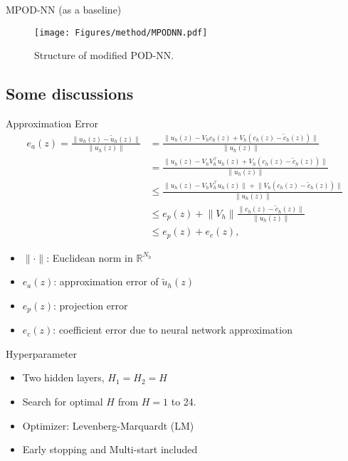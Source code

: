 \documentclass[10pt]{beamer}
\newcommand{\lv}{\lVert}
\newcommand{\rv}{\rVert}
\begin{document}
\begin{frame}{MPOD-NN (as a baseline)}
\begin{figure}
\centering
\texttt{[image: Figures/method/MPODNN.pdf]}
\caption{Structure of modified POD-NN.}
\label{BiFiNN-structure}
\end{figure}
\end{frame}


\subsection{Some discussions} 

\begin{frame}{Approximation Error}
\begin{equation}
\label{error-realizatin}
\begin{aligned}
 e_a(z) = \frac{\lv u_h(z) -  \tilde{u}_h(z)\rv}{\lv u_h(z) \rv} %
 &= \frac{\lv u_h(z) - V_hc_h(z)+V_h(c_h(z)-\tilde{c}_h(z))\rv}{\lv u_h(z) \rv} \\
&= \frac{\lv u_h(z) - V_hV_h^\top u_h(z)+V_h(c_h(z) - \tilde{c}_h(z))\rv}{\lv u_h(z) \rv} \\
&\le \frac{\lv u_h(z) - V_hV_h^\top u_h(z)\rv+ \lv V_h(c_h(z) - \tilde{c}_h(z))\rv}{\lv u_h(z) \rv} \\
& \le e_{p}(z) + \lv V_h\rv\frac{\lv c_h(z)-\tilde{c}_h(z)\rv}{\lv u_h(z)\rv}\\
&\le e_{p}(z) + e_c(z),
\end{aligned}
\end{equation}
\begin{itemize}
	\item $\lv\cdot\rv$: Euclidean norm in $\mathbb{R}^{N_h} $
	\item $e_a(z) $: approximation error of $\tilde{u}_h(z) $
	\item $e_p(z) $: projection error
	\item $e_c(z) $: coefficient error due to neural network approximation
\end{itemize}
\end{frame}

\begin{frame}{Hyperparameter}
\begin{itemize}
	\item Two hidden layers, $H_1 = H_2 = H $
	\item Search for optimal $H$ from $H=1$ to 24.
	\item Optimizer: Levenberg-Marquardt (LM)
	\item Early stopping and Multi-start included
\end{itemize}
\end{frame}
\end{document}
